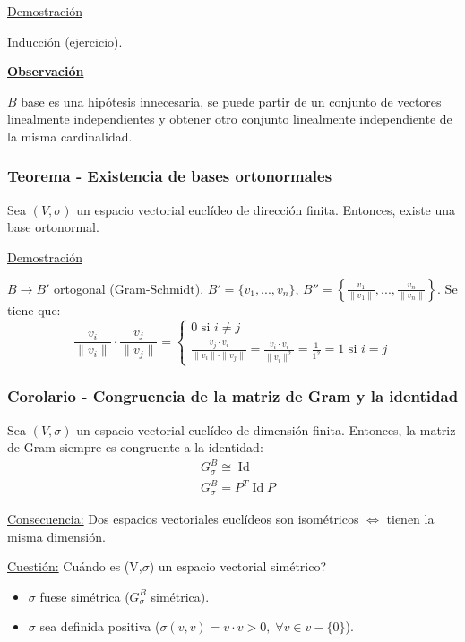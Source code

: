 \documentclass[12pt, a4paper, ones, notitlepage, openany,titlepage]{article}
\newcommand{\demostracion}{\noindent\underline{Demostración}}
\newcommand{\observacion}{\noindent\underline{\textbf{Observación}}}
\begin{document}
\demostracion

\noindent Inducción (ejercicio).

\observacion

$B$ base es una hipótesis innecesaria, se puede partir de un conjunto de vectores linealmente independientes y obtener otro conjunto linealmente independiente de la misma cardinalidad.

\subsubsection{Teorema - Existencia de bases ortonormales}
Sea $(V,\sigma)$ un espacio vectorial euclídeo de dirección finita. Entonces, existe una base ortonormal.

\demostracion

$B \longrightarrow B'$ ortogonal (Gram-Schmidt). $B'=\{v_1,...,v_n\}$, $B''=\left\{\frac{v_1}{\|v_1\|},...,\frac{v_n}{\|v_n\|}\right\}$. Se tiene que:
$$
\frac{v_i}{\|v_i\|} \cdot \frac{v_j}{\|v_j\|} =
\begin{cases}
	0 \text{ si } i \ne j \\
	\displaystyle \frac{v_j \cdot v_i}{\|v_i\| \cdot \|v_j\|} = \frac{v_i \cdot v_i}{\|v_i\|^2} = \frac{1}{1^2} = 1 \text{ si } i = j
\end{cases}
$$

\subsubsection{Corolario - Congruencia de la matriz de Gram y la identidad}
\noindent Sea $(V,\sigma)$ un espacio vectorial euclídeo de dimensión finita. Entonces, la matriz de Gram siempre es congruente a la identidad:
\begin{align*}
	& G_\sigma^B \cong \operatorname{Id} \\
	& G_\sigma^B = P^T\operatorname{Id}P
\end{align*}

\underline{Consecuencia:} Dos espacios vectoriales euclídeos son isométricos $\Longleftrightarrow$ tienen la misma dimensión.

\noindent \underline{Cuestión:} Cuándo es (V,$\sigma$) un espacio vectorial simétrico?
\begin{itemize}
	\item $\sigma$ fuese simétrica ($G_\sigma^B$ simétrica).
	\item $\sigma$ sea definida positiva ($\sigma(v,v)=v \cdot v > 0, \; \forall v \in v - \{0\}$).
\end{itemize}
\end{document}
